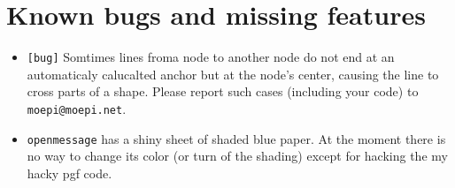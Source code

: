 \documentclass{scrartcl}
\begin{document}
\section{Known bugs and missing features}
\begin{itemize}\itemsep0pt
	\item \texttt{[bug]} Somtimes lines froma node to another node do not end
	at an automaticaly calucalted anchor but at the node's center, causing the
	line to cross parts of a shape.
	Please report such cases (including your code) to \texttt{moepi@moepi.net}.
	\item \verb|openmessage| has a shiny sheet of shaded blue paper. At the
	moment there is no way to change its color (or turn of the shading) except
	for hacking the my hacky pgf code.
\end{itemize}
\end{document}
